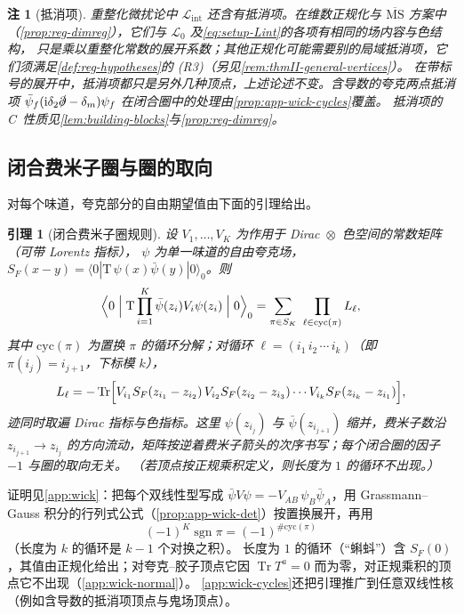 \documentclass[UTF8,a4paper,11pt,fontset=fandol]{ctexart}
\theoremstyle{cplain}
\newtheorem{lemma}[theorem]{引理}
\theoremstyle{cdefinition}
\theoremstyle{cremark}
\newtheorem{remark}[theorem]{注}
\numberwithin{equation}{section}
\DeclareMathOperator{\Tr}{Tr}
\newcommand{\sla}[1]{\slashed{#1}}                  %
\newcommand{\SF}{S_{F}}                              %
\newcommand{\ii}{\mathrm{i}}                        %
\begin{document}
\begin{remark}[抵消项]\label{rem:setup-counterterms}
重整化微扰论中 $\mathcal L_{\mathrm{int}}$ 还含有抵消项。在维数正规化与 $\overline{\mathrm{MS}}$ 方案中（\cref{prop:reg-dimreg}），它们与 $\mathcal L_0$ 及\cref{eq:setup-Lint}的各项有相同的场内容与色结构，
只是乘以重整化常数的展开系数；其他正规化可能需要别的局域抵消项，它们须满足\cref{def:reg-hypotheses}的 (R3)（另见\cref{rem:thmII-general-vertices}）。
在带标号的展开中，抵消项都只是另外几种顶点，上述论述不变。含导数的夸克两点抵消项 $\bar\psi_f(\ii\delta_2\sla\partial-\delta_m)\psi_f$ 在闭合圈中的处理由\cref{prop:app-wick-cycles}覆盖。
抵消项的 C~性质见\cref{lem:building-blocks}与\cref{prop:reg-dimreg}。
\end{remark}

\subsection{闭合费米子圈与圈的取向}\label{sec:setup-loops}

对每个味道，夸克部分的自由期望值由下面的引理给出。

\begin{lemma}[闭合费米子圈规则]\label{lem:closed-loops}
设 $V_1,\dots,V_K$ 为作用于 Dirac~$\otimes$~色空间的常数矩阵（可带 Lorentz 指标），
$\psi$ 为单一味道的自由夸克场，$\SF(x-y)=\langle0|\mathrm T\,\psi(x)\bar\psi(y)|0\rangle_0$。则
\begin{equation}\label{eq:closed-loops}
\Bigl\langle0\Bigm|\mathrm T\prod_{i=1}^{K}\bar\psi(z_i)V_i\psi(z_i)\Bigm|0\Bigr\rangle_0
=\sum_{\pi\in S_K}\ \prod_{\ell\in\mathrm{cyc}(\pi)}L_\ell ,
\end{equation}
其中 $\mathrm{cyc}(\pi)$ 为置换 $\pi$ 的循环分解；对循环 $\ell=(i_1\,i_2\,\cdots\,i_k)$（即 $\pi(i_j)=i_{j+1}$，下标模 $k$），
\begin{equation}\label{eq:loop-factor}
L_\ell=-\Tr\Bigl[V_{i_1}\SF(z_{i_1}-z_{i_2})\,V_{i_2}\SF(z_{i_2}-z_{i_3})\cdots V_{i_k}\SF(z_{i_k}-z_{i_1})\Bigr],
\end{equation}
迹同时取遍 Dirac 指标与色指标。这里 $\psi(z_{i_j})$ 与 $\bar\psi(z_{i_{j+1}})$ 缩并，费米子数沿
$z_{i_{j+1}}\to z_{i_j}$ 的方向流动，矩阵按逆着费米子箭头的次序书写；每个闭合圈的因子 $-1$ 与圈的取向无关。
（若顶点按正规乘积定义，则长度为 $1$ 的循环不出现。）
\end{lemma}

证明见\cref{app:wick}：把每个双线性型写成 $\bar\psi V\psi=-V_{AB}\,\psi_B\bar\psi_A$，用 Grassmann--Gauss 积分的行列式公式（\cref{prop:app-wick-det}）按置换展开，再用
\begin{equation}\label{eq:setup-sign}
(-1)^K\operatorname{sgn}\pi=(-1)^{\#\mathrm{cyc}(\pi)}
\end{equation}
（长度为 $k$ 的循环是 $k-1$ 个对换之积）。
长度为 $1$ 的循环（“蝌蚪”）含 $\SF(0)$，其值由正规化给出；对夸克--胶子顶点它因 $\Tr T^a=0$ 而为零，对正规乘积的顶点它不出现（\cref{app:wick-normal}）。
\cref{app:wick-cycles}还把引理推广到任意双线性核（例如含导数的抵消项顶点与鬼场顶点）。
\end{document}
